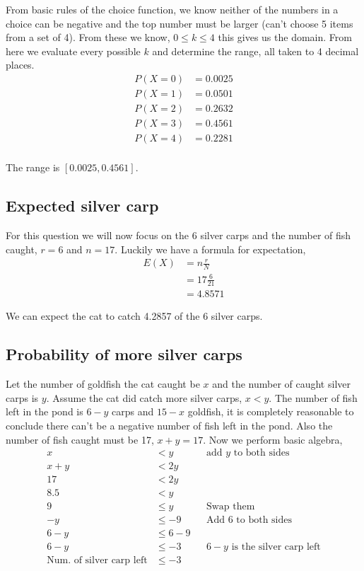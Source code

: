 \documentclass{article}
\begin{document}
From basic rules of the choice function, we know neither of the numbers in a
choice can be negative and the top number must be larger (can't choose 5 items
from a set of 4). From these we know, $0 \leq k \leq 4$ this gives us the
domain. From here we evaluate every possible $k$ and determine the range,
all taken to 4 decimal places.
\begin{align*}
    P(X=0) &= 0.0025 \\
    P(X=1) &= 0.0501 \\
    P(X=2) &= 0.2632 \\
    P(X=3) &= 0.4561 \\
    P(X=4) &= 0.2281 \\
\end{align*}

The range is $[0.0025, 0.4561]$.

\subsection{Expected silver carp}
For this question we will now focus on the 6 silver carps and the number of
fish caught, $r=6$ and $n=17$. Luckily we have a formula for expectation,
\begin{align*}
    E(X) &= n\frac{r}{N} \\
    &= 17 \frac{6}{21} \\
    &= 4.8571
\end{align*}

We can expect the cat to catch 4.2857 of the 6 silver carps.

\subsection{Probability of more silver carps}
Let the number of goldfish the cat caught be $x$ and the number of caught
silver carps is $y$. Assume the cat did catch more silver carps, $x < y$.
The number of fish left in the pond is $6-y$ carps and $15-x$ goldfish,
it is completely reasonable to conclude there can't be a negative number of
fish left in the pond.
Also the number of fish caught must be 17, $x+y=17$.
Now we perform basic algebra,
\begin{align*}
    x &< y && \text{add $y$ to both sides} \\
    x+y &< 2y \\
    17 &< 2y \\
    8.5 &< y \\
    9 &\leq y && \text{Swap them} \\
    -y &\leq -9 && \text{Add 6 to both sides} \\
    6-y &\leq 6-9 \\
    6-y &\leq -3 && \text{$6-y$ is the silver carp left} \\
    \text{Num. of silver carp left} &\leq -3
\end{align*}
\end{document}
